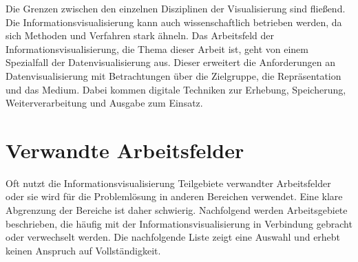 \documentclass[a4paper, 
               12pt,
               DIV=calc,
               version=first,
               pdftex,
               headsepline,
               footsepline,
               bibtotocnumbered,
               liststotocnumbered]{scrreprt}
\begin{document}
Die Grenzen zwischen den einzelnen Disziplinen der Visualisierung sind fließend. Die Informationsvisualisierung kann
auch wissenschaftlich betrieben werden, da sich Methoden und Verfahren stark ähneln.
Das Arbeitsfeld der Informationsvisualisierung, die Thema dieser Arbeit ist,
geht von einem Spezialfall der Datenvisualisierung aus. Dieser erweitert die Anforderungen an Datenvisualisierung mit
Betrachtungen über die Zielgruppe, die Repräsentation und das Medium. Dabei kommen digitale
Techniken zur Erhebung, Speicherung, Weiterverarbeitung und Ausgabe zum Einsatz.

\section{Verwandte Arbeitsfelder}
\label{sec:Arbeitsfelder}
Oft nutzt die Informationsvisualisierung Teilgebiete verwandter Arbeitsfelder oder sie wird für die Problemlösung
in anderen Bereichen verwendet. Eine klare Abgrenzung der Bereiche ist daher schwierig.
Nachfolgend werden Arbeitsgebiete beschrieben, die häufig mit der Informationsvisualisierung in Verbindung
gebracht oder verwechselt werden. Die nachfolgende Liste zeigt
eine Auswahl und erhebt keinen Anspruch auf Vollständigkeit.
\end{document}
